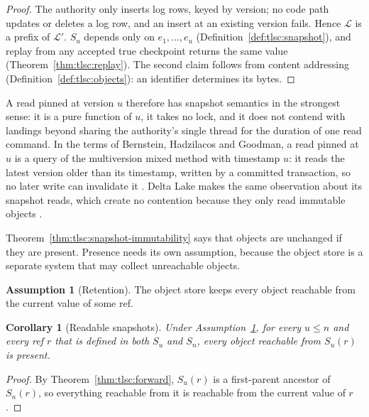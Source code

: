 \documentclass[11pt,letterpaper]{article}
\newtheorem{corollary}[theorem]{Corollary}
\theoremstyle{definition}
\newtheorem{assumption}[theorem]{Assumption}
\theoremstyle{remark}
\newcommand{\Snap}[1]{S_{#1}}
\newcommand{\Log}{\mathcal{L}}
\begin{document}
\begin{proof}
The authority only inserts log rows, keyed by version; no code path updates or deletes a log row, and an insert at an existing version fails. Hence $\Log$ is a prefix of $\Log'$. $\Snap{u}$ depends only on $e_1,\dots,e_u$ (Definition~\ref{def:tlsc:snapshot}), and replay from any accepted true checkpoint returns the same value (Theorem~\ref{thm:tlsc:replay}). The second claim follows from content addressing (Definition~\ref{def:tlsc:objects}): an identifier determines its bytes.
\end{proof}

A read pinned at version $u$ therefore has snapshot semantics in the strongest sense: it is a pure function of $u$, it takes no lock, and it does not contend with landings beyond sharing the authority's single thread for the duration of one read command. In the terms of Bernstein, Hadzilacos and Goodman, a read pinned at $u$ is a query of the multiversion mixed method with timestamp $u$: it reads the latest version older than its timestamp, written by a committed transaction, so no later write can invalidate it \cite[Section 5.5]{bhg1987}. Delta Lake makes the same observation about its snapshot reads, which create no contention because they only read immutable objects \cite{armbrust2020delta}.

Theorem~\ref{thm:tlsc:snapshot-immutability} says that objects are unchanged if they are present. Presence needs its own assumption, because the object store is a separate system that may collect unreachable objects.

\begin{assumption}[Retention]
\label{ass:tlsc:retention}
The object store keeps every object reachable from the current value of some ref.
\end{assumption}

\begin{corollary}[Readable snapshots]
\label{cor:tlsc:readable}
Under Assumption~\ref{ass:tlsc:retention}, for every $u\leq n$ and every ref $r$ that is defined in both $\Snap{u}$ and $\Snap{n}$, every object reachable from $\Snap{u}(r)$ is present.
\end{corollary}

\begin{proof}
By Theorem~\ref{thm:tlsc:forward}, $\Snap{u}(r)$ is a first-parent ancestor of $\Snap{n}(r)$, so everything reachable from it is reachable from the current value of $r$.
\end{proof}
\end{document}
